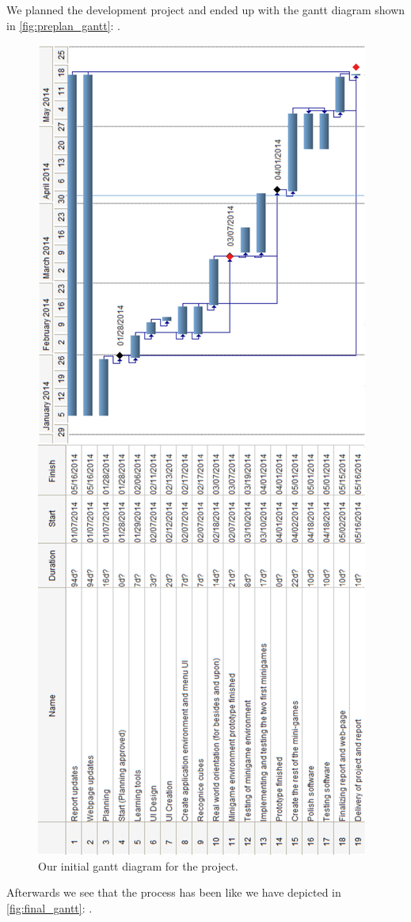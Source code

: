 We planned the development project and ended up with the gantt diagram shown in \autoref{fig:preplan_gantt}: .

\begin{figure}[ht]
	\capstart
	\centering
	\includegraphics[height=\textwidth, angle=270]{images/preplan_gantt_diagram}
	\caption[Preplan Gantt diagram]{Our initial gantt diagram for the project.}
	\label{fig:preplan_gantt}
\end{figure}


Afterwards we see that the process has been like we have depicted in \autoref{fig:final_gantt}: .

